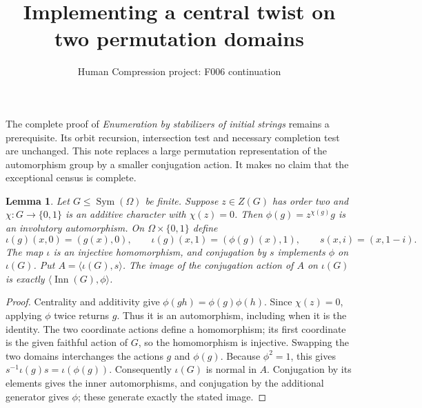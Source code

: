 \documentclass[11pt,a4paper]{article}
\title{Implementing a central twist on two permutation domains}
\author{Human Compression project: F006 continuation}\date{}
\newtheorem{lemma}{Lemma}\newtheorem{proposition}[lemma]{Proposition}
\begin{document}
\maketitle
The complete proof of \emph{Enumeration by stabilizers of initial strings}
remains a prerequisite. Its orbit recursion, intersection test and necessary
completion test are unchanged. This note replaces a large permutation
representation of the automorphism group by a smaller conjugation action.
It makes no claim that the exceptional census is complete.

\begin{lemma}
Let $G\leq\operatorname{Sym}(\Omega)$ be finite. Suppose $z\in Z(G)$
has order two and $\chi:G\to\{0,1\}$ is an additive character with
$\chi(z)=0$. Then $\phi(g)=z^{\chi(g)}g$ is an involutory automorphism.
On $\Omega\times\{0,1\}$ define
\[
 \iota(g)(x,0)=(g(x),0),\qquad
 \iota(g)(x,1)=(\phi(g)(x),1),\qquad s(x,i)=(x,1-i).
\]
The map $\iota$ is an injective homomorphism, and conjugation by $s$
implements $\phi$ on $\iota(G)$. Put
$A=\langle\iota(G),s\rangle$. The image of the conjugation action of
$A$ on $\iota(G)$ is exactly
$\langle\operatorname{Inn}(G),\phi\rangle$.
\end{lemma}
\begin{proof}
Centrality and additivity give
$\phi(gh)=\phi(g)\phi(h)$. Since $\chi(z)=0$, applying $\phi$ twice
returns $g$. Thus it is an automorphism, including when it is the identity.
The two coordinate actions define a homomorphism; its first coordinate is
the given faithful action of $G$, so the homomorphism is injective.
Swapping the two domains interchanges the actions $g$ and $\phi(g)$.
Because $\phi^2=1$, this gives
$s^{-1}\iota(g)s=\iota(\phi(g))$. Consequently $\iota(G)$ is normal
in $A$. Conjugation by its elements gives the inner automorphisms, and
conjugation by the additional generator gives $\phi$; these generate
exactly the stated image.
\end{proof}
\end{document}
